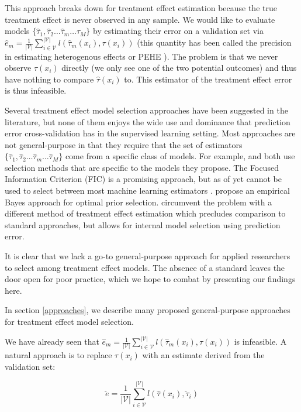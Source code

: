 This approach breaks down for treatment effect estimation because the true treatment effect is never observed in any sample. We would like to evaluate models $\{\hat\tau_1, \hat\tau_2 \dots \hat \tau_m \dots \hat \tau_M\}$ by estimating their error on a validation set via $\hat e_m = \frac{1}{|\mathcal{V}|}\sum_{i \in \mathcal{V}}^{|\mathcal{V}|}  l(\hat \tau_m (x_i), \tau(x_i))$ (this quantity has been called the precision in estimating heterogenous effects or PEHE \cite{Hill2011}). The problem is that we never observe $\tau(x_i)$ directly (we only see one of the two potential outcomes) and thus have nothing to compare $\hat\tau(x_i)$ to. This estimator of the treatment effect error is thus infeasible.

Several treatment effect model selection approaches have been suggested in the literature, but none of them enjoys the wide use and dominance that prediction error cross-validation has in the supervised learning setting. Most approaches are not general-purpose in that they require that the set of estimators $\{\hat\tau_1, \hat\tau_2 \dots \hat \tau_m \dots \hat \tau_M\}$ come from a specific class of models. For example, \citet{Powers:2017wd} and \citet{Athey2015} both use selection methods that are specific to the models they propose. The Focused Information Criterion (FIC) \cite{Claeskens:2003ck} is a promising approach, but as of yet cannot be used to select between most machine learning estimators \cite{Jullum:2012uo}. \citet{Alaa:tj} propose an empirical Bayes approach for optimal prior selection. \citet{Nie:2017vi} circumvent the problem with a different method of treatment effect estimation which precludes comparison to standard approaches, but allows for internal model selection using prediction error. 

It is clear that we lack a go-to general-purpose approach for applied researchers to select among treatment effect models. The absence of a standard leaves the door open for poor practice, which we hope to combat by presenting our findings here.

In section \ref{approaches}, we describe many proposed general-purpose approaches for treatment effect model selection.

We have already seen that $\hat e_m = \frac{1}{|\mathcal{V}|}\sum_{i \in \mathcal{V}}^{|\mathcal{V}|}  l(\hat \tau_m (x_i), \tau(x_i))$ is infeasible. A natural approach is to replace $\tau(x_i)$ with an estimate derived from the validation set:

\begin{equation}
\check e = \frac{1}{|\mathcal{V}|}\sum_{i \in \mathcal{V}}^{|\mathcal{V}|}  l(\hat \tau (x_i), \check \tau_i)
\label{te-error}
\end{equation}

